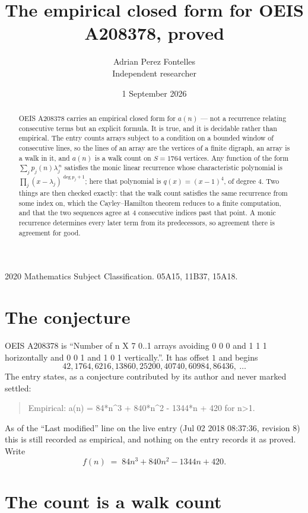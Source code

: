 \documentclass[11pt,a4paper]{article}
\title{The empirical closed form for OEIS A208378, proved}
\author{Adrian Perez Fontelles\\ \small Independent researcher}
\date{1 September 2026}
\theoremstyle{plain}
\theoremstyle{definition}
\begin{document}
\maketitle

\begin{abstract}
OEIS A208378 carries an empirical closed form for $a(n)$ --- not a recurrence relating
consecutive terms but an explicit formula. It is true, and it is decidable rather than
empirical. The entry counts arrays subject to a condition on a bounded window of consecutive lines, so the lines of an array are the
vertices of a finite digraph, an array is a walk in it, and $a(n)$ is a walk count on
$S=1764$ vertices. Any function of the form $\sum_j p_j(n)\lambda_j^{\,n}$ satisfies the
monic linear recurrence whose characteristic polynomial is
$\prod_j(x-\lambda_j)^{\deg p_j+1}$; here that polynomial is $q(x)=(x-1)^{4}$, of degree
$4$. Two things are then checked exactly: that the walk count satisfies the same
recurrence from some index on, which the Cayley--Hamilton theorem reduces to a finite
computation, and that the two sequences agree at $4$ consecutive indices past that
point. A monic recurrence determines every later term from its predecessors, so agreement
there is agreement for good.
\end{abstract}

\noindent\small 2020 Mathematics Subject Classification. 05A15, 11B37, 15A18.\normalsize

\section{The conjecture}

OEIS A208378 is ``Number of n X 7 0..1 arrays avoiding 0 0 0 and 1 1 1 horizontally and 0 0 1 and 1 0 1 vertically.''. It has offset $1$ and begins
\[
42, 1764, 6216, 13860, 25200, 40740, 60984, 86436,\ \dots
\]
The entry states, as a conjecture contributed by its author and never marked settled:
\begin{quote}
Empirical: a(n) = 84*n\^{}3 + 840*n\^{}2 - 1344*n + 420 for n>1.
\end{quote}
As of the ``Last modified'' line on the live entry (Jul 02 2018 08:37:36, revision 8) this is still
recorded as empirical, and nothing on the entry records it as proved. Write
\[
f(n)\;=\;84 n^{3} + 840 n^{2} - 1344 n + 420.
\]

\section{The count is a walk count}
\end{document}
